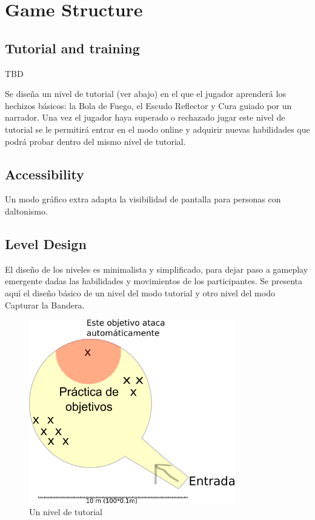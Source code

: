 \documentclass[12pt]{report}
\begin{document}
\newpage

\section{Game Structure}              

\subsection{Tutorial and training}

TBD

Se diseña un nivel de tutorial (ver abajo) en el que el jugador aprenderá los hechizos básicos: la Bola de Fuego, el Escudo Reflector y Cura guiado por un narrador. Una vez el jugador haya superado o rechazado jugar este nivel de tutorial se le permitirá entrar en el modo online y adquirir nuevas habilidades que podrá probar dentro del mismo nivel de tutorial.

\subsection{Accessibility}

Un modo gráfico extra adapta la visibilidad de pantalla para personas con daltonismo.

\subsection{Level Design}

El diseño de los niveles es minimalista y simplificado, para dejar paso a gameplay emergente dadas las habilidades y movimientos de los participantes. Se presenta aquí el diseño básico de un nivel del modo tutorial y otro nivel del modo Capturar la Bandera.

\begin{figure}[H]
    \centering
    \includegraphics[width=0.8\textwidth]{tutorial}
    \caption{Un nivel de tutorial}
\end{figure}
\end{document}
